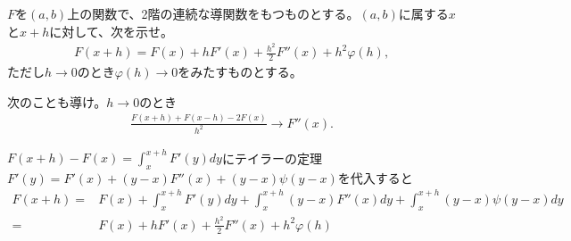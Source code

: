 \begin{renshu}
$F$を$(a,b)$上の関数で、2階の連続な導関数をもつものとする。$(a,b)$に属する$x$と$x+h$に対して、次を示せ。
\begin{align}
F(x+h)=F(x)+hF'(x)+\frac{h^2}{2}F''(x)+h^{2}\varphi(h),
\end{align}
ただし$h\to 0$のとき$\varphi(h)\to 0$をみたすものとする。

次のことも導け。$h\to 0$のとき
\begin{align}
\frac{F(x+h)+F(x-h)-2F(x)}{h^{2}}\to F''(x).
\end{align}
\end{renshu}

\begin{kaitou*}
$F(x+h)-F(x)=\int_{x}^{x+h}F'(y)dy$にテイラーの定理$F'(y)=F'(x)+(y-x)F''(x)+(y-x)\psi(y-x)$を代入すると
\begin{align}
F(x+h)=&F(x)+\int_{x}^{x+h}F'(y)dy+\int_{x}^{x+h}(y-x)F''(x)dy+\int_{x}^{x+h}(y-x)\psi(y-x)dy\\
=&F(x)+hF'(x)+\frac{h^2}{2}F''(x)+h^{2}\varphi(h)
\end{align}
\red{[なぜ?]}
\end{kaitou*}